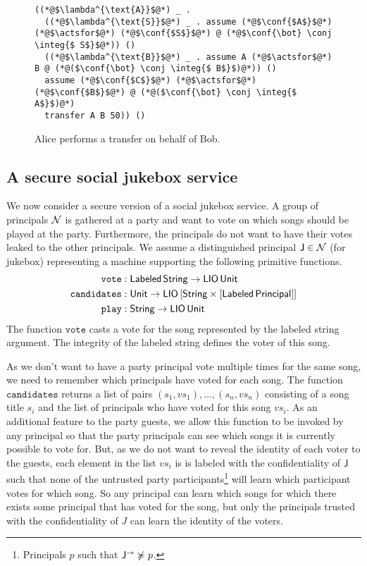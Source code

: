 \begin{figure}
\centering
\begin{lstlisting}
((*@$\lambda^{\text{A}}$@*) _ .
  ((*@$\lambda^{\text{S}}$@*) _ . assume (*@$\conf{$A$}$@*) (*@$\actsfor$@*) (*@$\conf{$S$}$@*) @ (*@$\conf{\bot} \conj \integ{$ S$}$@*)) ()
  ((*@$\lambda^{\text{B}}$@*) _ . assume A (*@$\actsfor$@*) B @ (*@($\conf{\bot} \conj \integ{$ B$}$)@*)) ()
  assume (*@$\conf{$C$}$@*) (*@$\actsfor$@*) (*@$\conf{$B$}$@*) @ (*@($\conf{\bot} \conj \integ{$ A$}$)@*)
  transfer A B 50)) ()
\end{lstlisting}
\caption{Alice performs a transfer on behalf of Bob.}
\label{fig:sec-bank-alice-banks-for-bob}
\end{figure}

\subsection{A secure social jukebox service}
We now consider a secure version of a social jukebox service. A group of principals $\mathcal{N}$ is gathered at a party and want to vote on which songs should be played at the party. Furthermore, the principals do not want to have their votes leaked to the other principals. We assume a distinguished principal $\mathsf{J} \in \mathcal{N}$ (for jukebox) representing a machine supporting the following primitive functions.
\begin{align*}
\mathtt{vote}&: \mathsf{Labeled}\,\mathsf{String} \rightarrow \mathsf{LIO}\,\mathsf{Unit}\\
\mathtt{candidates}&: \mathsf{Unit} \rightarrow \mathsf{LIO}\,\lbrack\mathsf{String} \times \lbrack\mathsf{Labeled}\,\mathsf{Principal}\rbrack\rbrack\\
\mathtt{play}&: \mathsf{String} \rightarrow \mathsf{LIO}\,\mathsf{Unit}
\end{align*}
The function $\mathtt{vote}$ casts a vote for the song represented by the labeled string argument. The integrity of the labeled string defines the voter of this song.

As we don't want to have a party principal vote multiple times for the same song, we need to remember which principals have voted for each song. The function $\mathtt{candidates}$ returns a list of pairs $(s_1, \mathit{vs}_1), \dots, (s_n, {\mathit{vs}}_n)$ consisting of a song title $s_i$ and the list of principals who have voted for this song $\mathit{vs}_i$. As an additional feature to the party guests, we allow this function to be invoked by any principal so that the party principals can see which songs it is currently possible to vote for. But, as we do not want to reveal the identity of each voter to the guests, each element in the list $\mathit{vs}_i$ is is labeled with the confidentiality of $\mathsf{J}$ such that none of the untrusted party participants\footnote{Principals $p$ such that $\mathsf{J}^{\rightarrow} \not\succcurlyeq p$.} will learn which participant votes for which song. So any principal can learn which songs for which there exists some principal that has voted for the song, but only the principals trusted with the confidentiality of $J$ can learn the identity of the voters.

